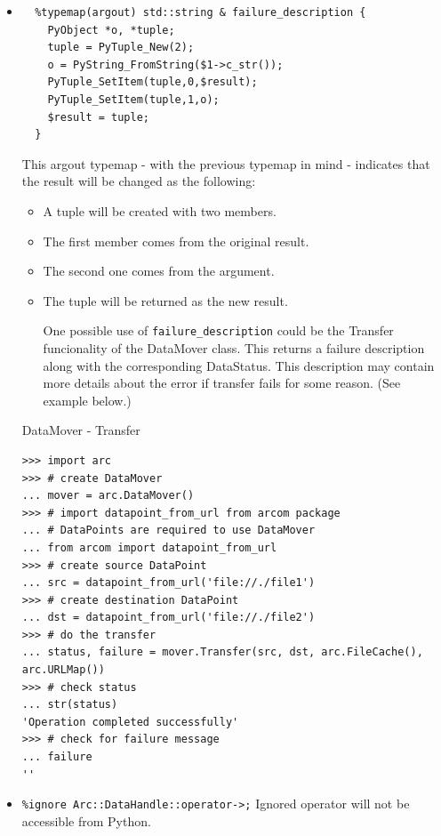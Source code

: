 \documentclass{article}
\begin{document}
\begin{flushleft}
\begin{itemize}
  \item{ \begin{verbatim}
  %typemap(argout) std::string & failure_description {
    PyObject *o, *tuple;
    tuple = PyTuple_New(2);
    o = PyString_FromString($1->c_str());
    PyTuple_SetItem(tuple,0,$result);
    PyTuple_SetItem(tuple,1,o);
    $result = tuple;
  }
  \end{verbatim}
  This argout typemap - with the previous typemap in mind - indicates that the result will be changed as the following:
    \begin{itemize}
    \item{
      A tuple will be created with two members.
    }
    \item{
      The first member comes from the original result.
    }
    \item{
      The second one comes from the argument.
    }
    \item{
      The tuple will be returned as the new result.
    }

  One possible use of \verb$failure_description$ could be the Transfer funcionality of the 
  DataMover class. This returns a failure description along with the corresponding 
  DataStatus. This description may contain more details about the error if transfer 
  fails for some reason.
  (See example below.)
    \end{itemize}
    \begin{example}
      \caption{DataMover - Transfer}\label{dmex}
\begin{verbatim}
>>> import arc
>>> # create DataMover
... mover = arc.DataMover()
>>> # import datapoint_from_url from arcom package
... # DataPoints are required to use DataMover
... from arcom import datapoint_from_url
>>> # create source DataPoint
... src = datapoint_from_url('file://./file1')
>>> # create destination DataPoint
... dst = datapoint_from_url('file://./file2')
>>> # do the transfer
... status, failure = mover.Transfer(src, dst, arc.FileCache(), arc.URLMap())
>>> # check status
... str(status)
'Operation completed successfully'
>>> # check for failure message
... failure
''
\end{verbatim}
    \end{example}
  }
\end{itemize}
\begin{itemize}
  \item{\verb$%ignore Arc::DataHandle::operator->;$} \linebreak
  Ignored operator will not be accessible from Python.
\end{itemize}
\end{flushleft}
\end{document}
